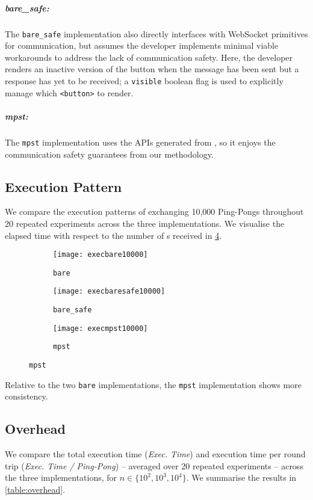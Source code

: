 \subparagraph{bare_safe:}
The \texttt{bare_safe} implementation also directly interfaces with
WebSocket primitives for communication, but assumes the developer
implements minimal viable workarounds to address the lack of
communication safety. Here, the developer renders an inactive version
of the  button when the  message has been sent
but a response has yet to be received; a \texttt{visible} boolean flag
is used to explicitly manage which \texttt{<button>} to render.

\subparagraph{mpst:}
The \texttt{mpst} implementation uses the APIs generated from 
, so it enjoys the
communication safety guarantees from our methodology.

\subsection{Execution Pattern}
\label{section:execpattern}

We compare the execution patterns of exchanging 10,000 Ping-Pongs
throughout 20 repeated experiments across the three implementations.
We visualise the elapsed time with respect to the number of s
received in \cref{fig:execution}.

\begin{figure}[!ht]
\centering
\begin{subfigure}[b]{0.3\textwidth}
\centering
\texttt{[image: execbare10000]}
\caption{\texttt{bare}}
\label{fig:executionbare}
\end{subfigure}
\hfill
\begin{subfigure}[b]{0.3\textwidth}
\centering
\texttt{[image: execbaresafe10000]}
\caption{\texttt{bare_safe}}
\label{fig:executionbaresafe}
\end{subfigure}
\hfill
\begin{subfigure}[b]{0.3\textwidth}
\centering
\texttt{[image: execmpst10000]}
\caption{\texttt{mpst}}
\label{fig:executionmpst}
\end{subfigure}
\label{fig:execution}
\end{figure}

Relative to the two \texttt{bare} implementations, the
\texttt{mpst} implementation shows more consistency.

\subsection{Overhead}
We compare the total execution time (\textit{Exec. Time}) 
and execution time per round trip (\textit{Exec. Time / Ping-Pong}) -- 
averaged over 20 repeated experiments -- across the three implementations,
for $n \in \{10^2, 10^3, 10^4\}$.
We summarise the results in \cref{table:overhead}.

